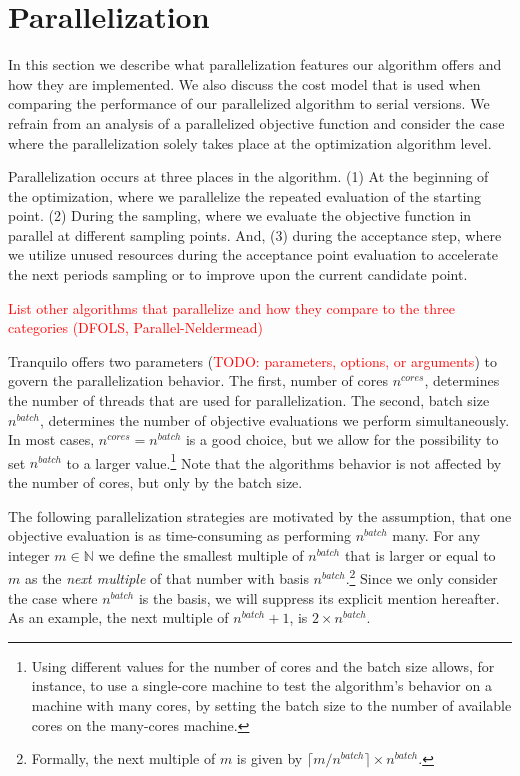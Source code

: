 \section{Parallelization}\label{sec:parallelization}

In this section we describe what parallelization features our algorithm offers and how they are
implemented. We also discuss the cost model that is used when comparing the performance of our
parallelized algorithm to serial versions. We refrain from an analysis of a parallelized objective
function and consider the case where the parallelization solely takes place at the optimization
algorithm level.

Parallelization occurs at three places in the algorithm. (1) At the beginning of the optimization,
where we parallelize the repeated evaluation of the starting point. (2) During the sampling, where
we evaluate the objective function in parallel at different sampling points. And, (3) during the
acceptance step, where we utilize unused resources during the acceptance point evaluation to
accelerate the next periods sampling or to improve upon the current candidate point.

\textcolor{red}{List other algorithms that parallelize and how they compare to the three categories
(DFOLS, Parallel-Neldermead)}

Tranquilo offers two parameters (\textcolor{red}{TODO: parameters, options, or arguments}) to govern
the parallelization behavior. The first, number of cores
$n^{cores}$, determines the number of threads that are used for parallelization. The second, batch
size $n^{batch}$, determines the number of objective evaluations we perform simultaneously. In most
cases, $n^{cores} = n^{batch}$ is a good choice, but we allow for the possibility to set $n^{batch}$
to a larger value.\footnote{Using different values for the number of cores and the batch size
allows, for instance, to use a single-core machine to test the algorithm's behavior on a machine
with many cores, by setting the batch size to the number of available cores on the many-cores
machine.} Note that the algorithms behavior is not affected by the number of cores, but only by the
batch size.

The following parallelization strategies are motivated by the assumption, that one
objective evaluation is as time-consuming as performing $n^{batch}$ many. For any integer $m \in
\mathbb{N}$ we define the smallest multiple of $n^{batch}$ that is larger or equal to $m$ as the
\emph{next multiple} of that number with basis $n^{batch}$.\footnote{Formally, the next
multiple of $m$ is given by $\lceil m / n^{batch}\rceil \times n^{batch}$.} Since we only consider
the case where $n^{batch}$ is the basis, we will suppress its explicit mention hereafter. As an
example, the next multiple of $n^{batch} + 1$, is $2 \times n^{batch}$.

